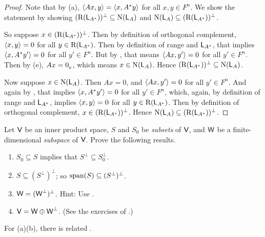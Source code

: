 \begin{proof}
Note that by (a), \(\left< Ax, y \right> = \left< x, A^* y \right>\) for all \(x, y \in F^n\). 
We show the statement by showing \((\mathrm{R}(\textsf{L}_{A^*}))^{\perp} \subseteq \mathrm{N}(\textsf{L}_A)\) and \(\mathrm{N}(\textsf{L}_A) \subseteq (\mathrm{R}(\textsf{L}_{A^*}))^{\perp}\).

So suppose \(x \in (\mathrm{R}(\textsf{L}_{A^*}))^{\perp}\).
Then by definition of orthogonal complement, \(\left< x, y \right> = 0\) for all \(y \in \mathrm{R}(\textsf{L}_{A^*})\).
Then by definition of range and \(\textsf{L}_{A^*}\), that implies \(\left< x, A^* y' \right> = 0\) for all \(y' \in F^n\).
But by , that means \(\left< Ax, y' \right> = 0\) for all \(y' \in F^n\).
Then by (e), \(Ax = 0_{_{\textsf{V}}}\), which means \(x \in \mathrm{N}(\textsf{L}_A)\).
Hence \((\mathrm{R}(\textsf{L}_{A^*}))^{\perp} \subseteq \mathrm{N}(\textsf{L}_A)\).

Now suppose \(x \in \mathrm{N}(\textsf{L}_A)\).
Then \(Ax = 0\), and \(\left< Ax, y' \right> = 0\) for all \(y' \in F^n\).
And again by , that implies \(\left< x, A^* y' \right> = 0\) for all \(y' \in F^n\), which, again, by definition of range and \(\textsf{L}_{A^*}\), implies \(\left< x, y \right> = 0\) for all \(y \in \mathrm{R}(\textsf{L}_{A^*})\).
Then by definition of orthogonal complement, \(x \in (\mathrm{R}(\textsf{L}_{A^*}))^{\perp}\).
Hence \(\mathrm{N}(\textsf{L}_A) \subseteq (\mathrm{R}(\textsf{L}_{A^*}))^{\perp}\).
\end{proof}

\begin{exercise} \label{exercise 6.2.13}
Let \(\textsf{V}\) be an inner product space, \(S\) and \(S_0\) be \emph{subsets} of \(\textsf{V}\), and \(\textsf{W}\) be a finite-dimensional \emph{subspace} of \(\textsf{V}\).
Prove the following results.
\begin{enumerate}
\item \(S_0 \subseteq S\) implies that \(S^{\perp} \subseteq S_0^{\perp}\).
\item \(S \subseteq (S^{\perp})^{\perp}\); so \(\operatorname{span}(S) \subseteq (S^{\perp})^{\perp}\).
\item \(\textsf{W} = (\textsf{W}^{\perp})^{\perp}\). Hint: Use .
\item \(\textsf{V} = \textsf{W} \oplus \textsf{W}^{\perp}\). (See the exercises of .)
\end{enumerate}
\end{exercise}

\begin{note}
For (a)(b), there is related .
\end{note}

